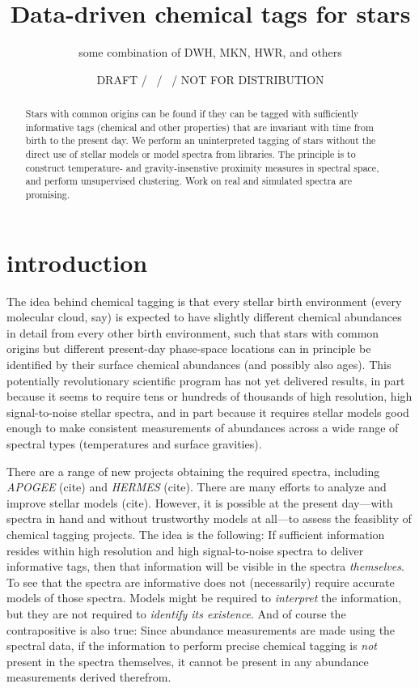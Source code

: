 \documentclass[12pt, preprint]{aastex}
\newcommand{\project}[1]{\textsl{#1}}
\begin{document}
\title{Data-driven chemical tags for stars}
\author{
  some combination of DWH, MKN, HWR, and others
}
\date{DRAFT / \gitdate\ / \githash\ / NOT FOR DISTRIBUTION}

\begin{abstract}
Stars with common origins can be found if they can be tagged with
sufficiently informative tags (chemical and other properties) that are
invariant with time from birth to the present day.
We perform an uninterpreted tagging of stars without the direct use of
stellar models or model spectra from libraries.
The principle is to construct temperature- and gravity-insenstive
proximity measures in spectral space, and perform unsupervised
clustering.
Work on real and simulated spectra are promising.
\end{abstract}

\section{introduction}

The idea behind chemical tagging is that every stellar birth
environment (every molecular cloud, say) is expected to have slightly
different chemical abundances in detail from every other birth
environment, such that stars with common origins but different
present-day phase-space locations can in principle be identified by
their surface chemical abundances (and possibly also ages).
This potentially revolutionary scientific program has not yet
delivered results, in part because it seems to require tens or
hundreds of thousands of high resolution, high signal-to-noise stellar
spectra, and in part because it requires stellar models good enough to
make consistent measurements of abundances across a wide range of
spectral types (temperatures and surface gravities).

There are a range of new projects obtaining the required spectra,
including \project{APOGEE} (cite) and \project{HERMES} (cite).
There are many efforts to analyze and improve stellar models (cite).
However, it is possible at the present day---with spectra in
hand and without trustworthy models at all---to assess the feasiblity
of chemical tagging projects.
The idea is the following:
If sufficient information resides within high resolution and high
signal-to-noise spectra to deliver informative tags, then that
information will be visible in the spectra \emph{themselves}.
To see that the spectra are informative does not (necessarily) require
accurate models of those spectra.
Models might be required to \emph{interpret} the information, but they
are not required to \emph{identify its existence}.
And of course the contrapositive is also true:
Since abundance measurements are made using the spectral data, if the
information to perform precise chemical tagging is \emph{not} present
in the spectra themselves, it cannot be present in any abundance
measurements derived therefrom.
\end{document}
